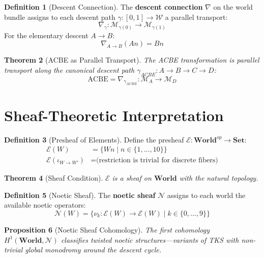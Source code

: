 \documentclass[11pt,twoside,openright]{book}
\theoremstyle{definition}
\newtheorem{definition}{Definition}[chapter]
\theoremstyle{plain}
\newtheorem{theorem}[definition]{Theorem}
\newtheorem{proposition}[definition]{Proposition}
\theoremstyle{remark}
\newcommand{\Worlds}{\mathcal{W}}
\newcommand{\noe}[1]{\nu_{#1}}
\begin{document}
\begin{definition}[Descent Connection]
\label{def:descent-connection}
The \textbf{descent connection} $\nabla$ on the world bundle assigns to each descent path $\gamma : [0,1] \to \Worlds$ a parallel transport:
\[
\nabla_\gamma : \mathcal{M}_{\gamma(0)} \to \mathcal{M}_{\gamma(1)}
\]
For the elementary descent $A \to B$:
\[
\nabla_{A \to B}(An) = Bn
\]
\end{definition}

\begin{theorem}[ACBE as Parallel Transport]
\label{thm:acbe-transport}
The ACBE transformation is parallel transport along the canonical descent path $\gamma_{ACBE} : A \to B \to C \to D$:
\[
\mathrm{ACBE} = \nabla_{\gamma_{ACBE}} : \mathcal{M}_A \to \mathcal{M}_D
\]
\end{theorem}

\section{Sheaf-Theoretic Interpretation}

\begin{definition}[Presheaf of Elements]
\label{def:presheaf-elements}
Define the presheaf $\mathcal{E} : \mathbf{World}^{op} \to \mathbf{Set}$:
\begin{align}
\mathcal{E}(W) &= \{Wn \mid n \in \{1, \ldots, 10\}\} \\
\mathcal{E}(\iota_{W \to W'}) &= \text{(restriction is trivial for discrete fibers)}
\end{align}
\end{definition}

\begin{theorem}[Sheaf Condition]
\label{thm:sheaf-condition}
$\mathcal{E}$ is a sheaf on $\mathbf{World}$ with the natural topology.
\end{theorem}

\begin{definition}[Noetic Sheaf]
\label{def:noetic-sheaf}
The \textbf{noetic sheaf} $\mathcal{N}$ assigns to each world the available noetic operators:
\[
\mathcal{N}(W) = \{\noe{k} : \mathcal{E}(W) \to \mathcal{E}(W) \mid k \in \{0, \ldots, 9\}\}
\]
\end{definition}

\begin{proposition}[Noetic Sheaf Cohomology]
\label{prop:noetic-cohomology}
The first cohomology $H^1(\mathbf{World}, \mathcal{N})$ classifies twisted noetic structures---variants of TKS with non-trivial global monodromy around the descent cycle.
\end{proposition}
\end{document}
